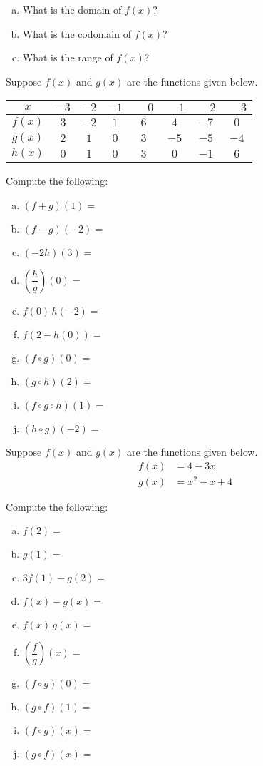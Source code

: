 \documentclass[11pt,letterpaper]{article}
\begin{document}
\begin{enumerate}[(a)]
\item What is the domain of $f(x)$?
\item What is the codomain of $f(x)$?
\item What is the range of $f(x)$?
\end{enumerate} \pspace


\prob Suppose $f(x)$ and $g(x)$ are the functions given below. 
        \begin{table}[H]
        \centering
        \begin{tabular}{| c || c | c | c | c | c | c | c |} \hline
	$x$ & $-3$ & $-2$ & $-1$ & $\phantom{-}0$ & $\phantom{-}1$ & $\phantom{-}2$ & $\phantom{-}3$ \\ \hline
	$f(x)$ & $3$ & $-2$ & $1$ & $6$ & $4$ & $-7$ & $0$ \\ \hline
	$g(x)$ & $2$ & $1$ & $0$ & $3$ & $-5$ & $-5$ & $-4$ \\ \hline
	$h(x)$ & $0$ & $1$ & $0$ & $3$ & $0$ & $-1$ & $6$ \\ \hline
        \end{tabular}
        \end{table}

Compute the following: \pspace
        \begin{enumerate}[(a)]
        \item $(f + g)(1)=$ 
        \item $(f - g)(-2)=$ 
        \item $(-2h)(3)=$ 
        \item $\left(\dfrac{h}{g}\right)(0)=$ 
        \item $f(0)\, h(-2)=$ 
        \item $f(2 - h(0))=$ 
        \item $(f \circ g)(0)=$ 
        \item $(g \circ h)(2)=$ 
        \item $(f \circ g \circ h)(1)=$ 
        \item $(h \circ g)(-2)=$
        \end{enumerate} \pspace


\prob Suppose $f(x)$ and $g(x)$ are the functions given below. 
	\[
	\begin{aligned}
	f(x)&= 4 - 3x \\[0.3cm]
	g(x)&= x^2 - x + 4
	\end{aligned}
	\]

Compute the following: \pspace
\begin{enumerate}[(a)]
\item $f(2)=$ 
\item $g(1)=$ 
\item $3f(1) - g(2)=$ 
\item $f(x) - g(x)=$ 
\item $f(x) \, g(x)=$ 
\item $\left( \dfrac{f}{g} \right)(x)=$ 
\item $(f \circ g)(0)=$ 
\item $(g \circ f)(1)=$ 
\item $(f \circ g)(x)=$ 
\item $(g \circ f)(x)=$ 
\end{enumerate} \pspace
\end{document}
